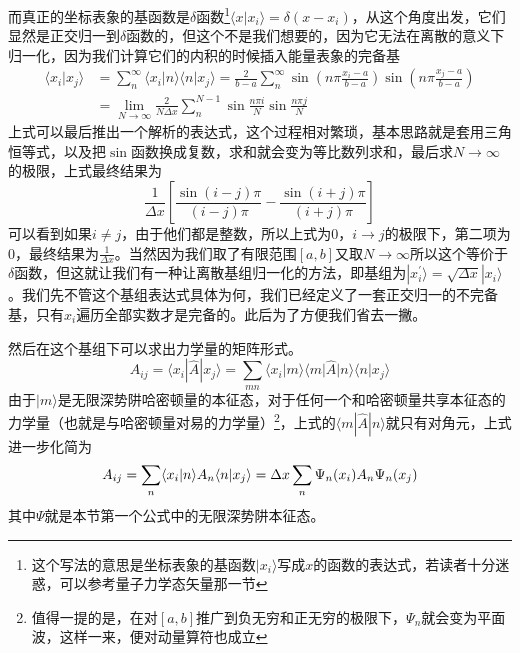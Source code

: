 \documentclass[12pt,a4paper,openany,twoside]{book}
\numberwithin{equation}{section}
\begin{document}
        而真正的坐标表象的基函数是$\delta$函数\footnote{这个写法的意思是坐标表象的基函数$ |x_i\rangle $写成$x$的函数的表达式，若读者十分迷惑，可以参考量子力学态矢量那一节}$ \langle x | x_i \rangle =\delta(x-x_i)$，从这个角度出发，它们显然是正交归一到$\delta$函数的，但这个不是我们想要的，因为它无法在离散的意义下归一化，因为我们计算它们的内积的时候插入能量表象的完备基
        \begin{equation}
          \begin{aligned}
            \langle x_i | x_j \rangle &= \sum_n^{\infty} \langle x_i | n \rangle \langle n | x_j \rangle = \frac{2}{b-a}\sum_n^{\infty}\sin\left(n\pi\frac{x_i-a}{b-a}\right)\sin\left(n\pi\frac{x_j-a}{b-a}\right)\\
            &=\lim_{N\to \infty}\frac{2}{N\Delta x}\sum_{n}^{N-1}\sin\frac{n\pi i}{N}\sin\frac{n\pi j}{N}
          \end{aligned}
        \end{equation}
        上式可以最后推出一个解析的表达式，这个过程相对繁琐，基本思路就是套用三角恒等式，以及把$\sin$函数换成复数，求和就会变为等比数列求和，最后求$N\to \infty$的极限，上式最终结果为
        \begin{equation}
          \frac{1}{\Delta x}\left[\frac{\sin (i-j)\pi}{(i-j)\pi}-\frac{\sin(i+j)\pi}{(i+j)\pi}\right]
        \end{equation}
        可以看到如果$i\neq j$，由于他们都是整数，所以上式为$0$，$i\to j$的极限下，第二项为$0$，最终结果为$\frac{1}{\Delta x}$。当然因为我们取了有限范围$[a,b]$又取$N\to \infty$所以这个等价于$\delta$函数，但这就让我们有一种让离散基组归一化的方法，即基组为$ | x_i^{\prime} \rangle = \sqrt{\Delta x} | x_i \rangle$。我们先不管这个基组表达式具体为何，我们已经定义了一套正交归一的不完备基，只有$x_i$遍历全部实数才是完备的。此后为了方便我们省去一撇。

        然后在这个基组下可以求出力学量的矩阵形式。
        \begin{equation}
          A_{ij}=\langle x_i | \hat{A} | x_j \rangle = \sum_{mn} \langle x_i | m \rangle \langle m | \hat{A} | n \rangle \langle n | x_j \rangle 
        \end{equation}
        由于$ | m \rangle $是无限深势阱哈密顿量的本征态，对于任何一个和哈密顿量共享本征态的力学量（也就是与哈密顿量对易的力学量）\footnote{值得一提的是，在对$[a,b]$推广到负无穷和正无穷的极限下，$\Psi_n$就会变为平面波，这样一来，便对动量算符也成立}，上式的$ \langle m | \hat{A} | n \rangle $就只有对角元，上式进一步化简为
        \begin{equation}
          A_{ij} = \sum_{n} \langle x_i | n \rangle A_n \langle n | x_j \rangle \\=\Delta x \sum_{n} \Psi_n(x_i) A_n \Psi_n(x_j)
        \end{equation}
        其中$\Psi$就是本节第一个公式中的无限深势阱本征态。
\end{document}
